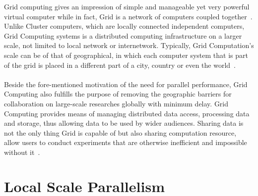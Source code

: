 Grid computing gives an impression of simple and manageable yet very powerful virtual computer while in fact, Grid is a network of computers coupled together~\cite{redbook}. Unlike Cluster computers, which are locally connected independent computers, Grid Computing systems is a distributed computing infrastructure on a larger scale, not limited to local network or internetwork. Typically, Grid Computation's scale can be of that of geographical, in which each computer system that is part of the grid is placed in a different part of a city, country or even the world~\cite{grid_tech}. \\
~\\
Beside the fore-mentioned motivation of the need for parallel performance, Grid Computing also fulfills the purpose of removing the geographic barriers for collaboration on large-scale researches globally with minimum delay. Grid Computing provides means of managing distributed data access, processing data and storage, thus allowing data to be used by wider audiences. Sharing data is not the only thing Grid is capable of but also sharing computation resource, allow users to conduct experiments that are otherwise inefficient and impossible without it~\cite{intro_grid}. \\


\section{Local Scale Parallelism}

